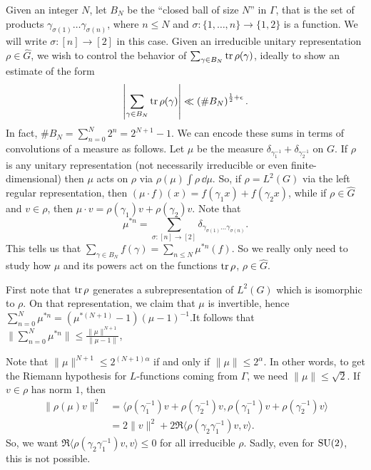 Given an integer $N$, let $B_N$ be the ``closed ball of size $N$'' in $\Gamma$, 
that is the set of products $\gamma_{\sigma(1)} \dots \gamma_{\sigma(n)}$, 
where $n\leqslant N$ and $\sigma\colon \{1,\dots,n\} \to \{1,2\}$ is a 
function. We will write $\sigma\colon [n] \to [2]$ in this case. Given an 
irreducible unitary representation $\rho\in \widehat G$, we wish to control 
the behavior of $\sum_{\gamma\in B_N} \operatorname{tr}\rho(\gamma)$, ideally to show an 
estimate of the form 
\[
	\left| \sum_{\gamma\in B_N} \operatorname{tr}\rho(\gamma)\right| \ll \left(\# B_N\right)^{\frac 1 2 + \epsilon} .
\]
In fact, $\# B_N = \sum_{n=0}^N 2^n = 2^{N+1} - 1$. We can encode these sums 
in terms of convolutions of a measure as follows. Let $\mu$ be the measure 
$\delta_{\gamma_1^{-1}} + \delta_{\gamma_2^{-1}}$ on $G$. 
If $\rho$ is any unitary representation (not necessarily irreducible or even 
finite-dimensional) then $\mu$ acts on $\rho$ via 
$\rho(\mu) \int \rho\, \dd\mu$. So, if $\rho = L^2(G)$ via the left regular 
representation, then $(\mu\cdot f)(x) = f(\gamma_1 x) + f(\gamma_2 x)$, while 
if $\rho\in \widehat G$ and $v\in \rho$, then 
$\mu\cdot v = \rho(\gamma_1) v + \rho(\gamma_2) v$. Note that 
\[
	\mu^{\ast n} = \sum_{\sigma\colon [n] \to [2]} \delta_{\gamma_{\sigma(1)} \dots \gamma_{\sigma(n)}} .
\]
This tells us that 
$\sum_{\gamma\in B_N} f(\gamma) = \sum_{n\leqslant N} \mu^{\ast n}(f)$. So 
we really only need to study how $\mu$ and its powers act on the functions 
$\operatorname{tr}\rho$, $\rho\in \widehat G$. 

First note that $\operatorname{tr}\rho$ generates a subrepresentation of $L^2(G)$ which is 
isomorphic to $\rho$. On that representation, we claim that $\mu$ is 
invertible, hence 
$\sum_{n=0}^N \mu^{\ast n} = (\mu^{\ast(N+1)} - 1)(\mu - 1)^{-1}$.It 
follows that 
$\| \sum_{n=0}^N \mu^{\ast n}\| \leqslant \frac{\|\mu\|^{N+1}}{\|\mu - 1\|}$, 

Note that $\|\mu\|^{N+1} \leqslant 2^{(N+1)\alpha}$ if and only if 
$\|\mu\| \leqslant 2^\alpha$. In other words, to get the Riemann hypothesis for 
$L$-functions coming from $\Gamma$, we need $\|\mu\| \leqslant \sqrt 2$. 
If $v\in \rho$ has norm $1$, then 
\begin{align*}
	\|\rho(\mu) v\|^2
		&= \langle \rho(\gamma_1^{-1}) v + \rho(\gamma_2^{-1}) v, \rho(\gamma_1^{-1}) v + \rho(\gamma_2^{-1}) v\rangle \\
		&= 2\|v\|^2 + 2\Re \langle \rho(\gamma_2 \gamma_1^{-1}) v,v\rangle .
\end{align*}
So, we want $\Re \langle \rho(\gamma_2 \gamma_1^{-1}) v,v\rangle \leqslant 0$ 
for all irreducible $\rho$. Sadly, even for $\operatorname{SU}(2)$, this is not possible. 

